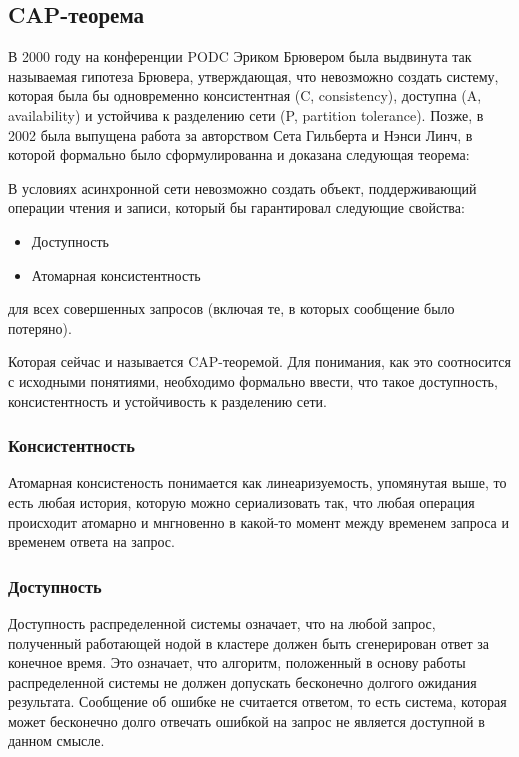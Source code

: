 \subsection{CAP-теорема}

В 2000 году на конференции PODC Эриком Брювером была выдвинута так называемая гипотеза Брювера, утверждающая, что невозможно создать систему, которая была бы одновременно консистентная (C, consistency), доступна (A, availability) и устойчива к разделению сети (P, partition tolerance)\cite{brewer}. Позже, в 2002 была выпущена работа за авторством Сета Гильберта и Нэнси Линч\cite{cap-proof}, в которой формально было сформулированна и доказана следующая теорема:

\begin{theorem}
	В условиях асинхронной сети невозможно создать объект, поддерживающий операции чтения и записи, который бы гарантировал следующие свойства:
	
	\begin{itemize}
		\item Доступность
		\item Атомарная консистентность
	\end{itemize}
	
	для всех совершенных запросов (включая те, в которых сообщение было потеряно).
\end{theorem}

Которая сейчас и называется CAP-теоремой. Для понимания, как это соотносится с исходными понятиями, необходимо формально ввести, что такое доступность, консистентность и устойчивость к разделению сети.

\subsubsection{Консистентность}

Атомарная консистеность понимается как линеаризуемость, упомянутая выше, то есть любая история, которую можно сериализовать так, что любая операция происходит атомарно и мнгновенно в какой-то момент между временем запроса и временем ответа на запрос.

\subsubsection{Доступность}

Доступность распределенной системы означает, что на любой запрос, полученный работающей нодой в кластере должен быть сгенерирован ответ за конечное время. Это означает, что алгоритм, положенный в основу работы распределенной системы не должен допускать бесконечно долгого ожидания результата. Сообщение об ошибке не считается ответом, то есть система, которая может бесконечно долго отвечать ошибкой на запрос не является доступной в данном смысле.

